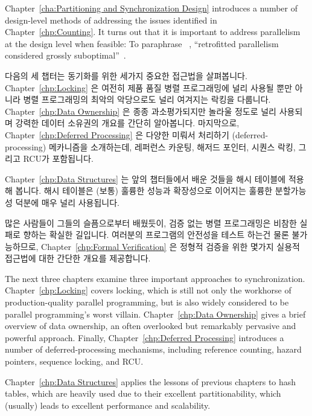 Chapter~\ref{cha:Partitioning and Synchronization Design}
introduces a number of design-level methods of addressing the issues
identified in Chapter~\ref{chp:Counting}.
It turns out that it is important to address parallelism at
the design level when feasible:
To paraphrase ~\cite{Dijkstra:1968:LEG:362929.362947},
``retrofitted parallelism considered grossly
suboptimal''~\cite{PaulEMcKenney2012HOTPARsuboptimal}.

\fi

다음의 세 챕터는 동기화를 위한 세가지 중요한 접근법을 살펴봅니다.
Chapter~\ref{chp:Locking} 은 여전히 제품 품질 병렬 프로그래밍에 널리 사용될
뿐만 아니라 병렬 프로그래밍의 최악의 악당으로도 널리 여겨지는 락킹을 다룹니다.
Chapter~\ref{chp:Data Ownership} 은 종종 과소평가되지만 놀라울 정도로 널리
사용되며 강력한 데이터 소유권의 개요를 간단히 알아봅니다.
마지막으로, Chapter~\ref{chp:Deferred Processing} 은 다양한 미뤄서 처리하기
(deferred-processing) 메카니즘을 소개하는데, 레퍼런스 카운팅, 해저드 포인터,
시퀀스 락킹, 그리고 RCU가 포함됩니다.

Chapter~\ref{chp:Data Structures} 는 앞의 챕터들에서 배운 것들을 해시 테이블에
적용해 봅니다.  해시 테이블은 (보통) 훌륭한 성능과 확장성으로 이어지는 훌륭한
분할가능성 덕분에 매우 널리 사용됩니다.

많은 사람들이 그들의 슬픔으로부터 배웠듯이, 검증 없는 병렬 프로그래밍은 비참한
실패로 향하는 확실한 길입니다.
여러분의 프로그램의 안전성을 테스트 하는건 물론 불가능하므로,
Chapter~\ref{chp:Formal Verification} 은 정형적 검증을 위한 몇가지 실용적
접근법에 대한 간단한 개요를 제공합니다.

\iffalse

The next three chapters examine three important approaches to
synchronization.
Chapter~\ref{chp:Locking} covers locking, which is still not only the
workhorse of production-quality parallel programming, but is also widely
considered to be parallel programming's worst villain.
Chapter~\ref{chp:Data Ownership} gives a brief overview of data ownership,
an often overlooked but remarkably pervasive and powerful approach.
Finally, Chapter~\ref{chp:Deferred Processing} introduces a number of
deferred-processing mechanisms, including reference counting,
hazard pointers, sequence locking, and RCU\@.

Chapter~\ref{chp:Data Structures} applies the lessons of previous
chapters to hash tables, which are heavily used due
to their excellent partitionability, which (usually) leads to excellent
performance and scalability.

